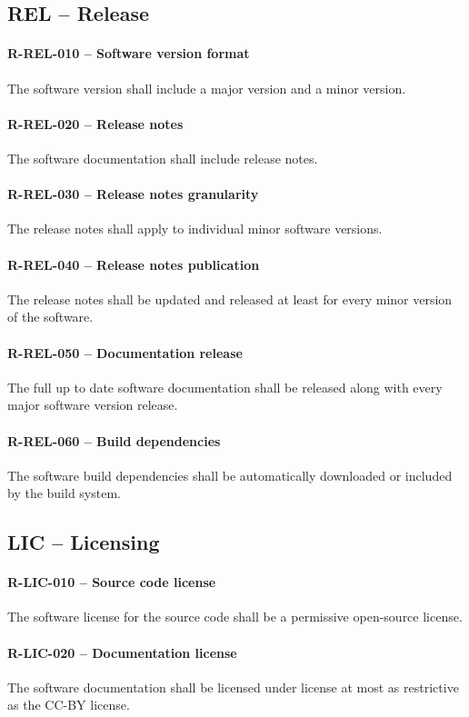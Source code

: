 \subsection{REL -- Release}
\paragraph{R-REL-010 -- Software version format}
The software version shall include a major version and a minor version.

\paragraph{R-REL-020 -- Release notes}
The software documentation shall include release notes.

\paragraph{R-REL-030 -- Release notes granularity}
The release notes shall apply to individual minor software versions.

\paragraph{R-REL-040 -- Release notes publication}
The release notes shall be updated and released at least for every minor
version of the software.

\paragraph{R-REL-050 -- Documentation release}
The full up to date software documentation shall be released along with
every major software version release.

\paragraph{R-REL-060 -- Build dependencies}
The software build dependencies shall be automatically downloaded or included by
the build system.

\subsection{LIC -- Licensing}
\paragraph{R-LIC-010 -- Source code license}
The software license for the source code shall be a permissive open-source
license.

\paragraph{R-LIC-020 -- Documentation license}
The software documentation shall be licensed under license at most as
restrictive as the CC-BY license.